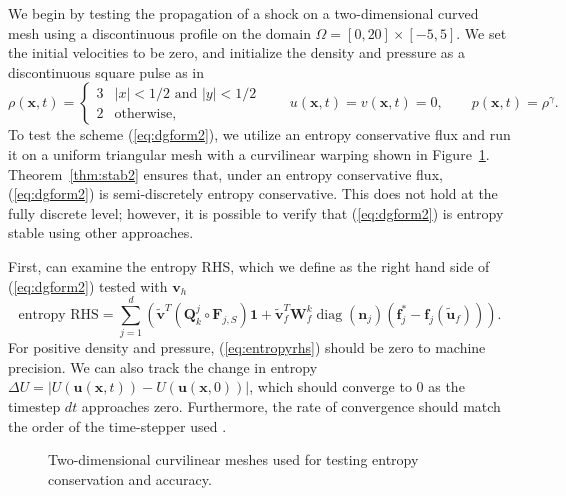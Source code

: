 \documentclass[preprint,10pt]{article}
\theoremstyle{definition}
\theoremstyle{lemma}
\theoremstyle{theorem}
\theoremstyle{assumption}
\DeclareMathOperator{\diag}{diag}
\renewcommand{\tilde}{\widetilde}
\newcommand{\LRp}[1]{\left( #1 \right)}
\newcommand{\LRb}[1]{\left| #1 \right|}
\begin{document}
{We begin by testing the propagation of a shock on a two-dimensional curved mesh using a discontinuous profile on the domain $\Omega = [0,20] \times [-5,5]$.   We set the initial velocities to be zero, and initialize the density and pressure as a discontinuous square pulse as in \cite{chan2017discretely}
\begin{equation}
\rho(\bm{x},t) = \begin{cases}
3 & \LRb{x} < 1/2 \text{ and } \LRb{y} < 1/2\\
2 & \text{otherwise},
\end{cases} \qquad 
u(\bm{x},t) = v(\bm{x},t) = 0, \qquad
p(\bm{x},t) = \rho^\gamma.
\label{eq:discontin}
\end{equation}
To test the scheme (\ref{eq:dgform2}), we utilize an entropy conservative flux and run it on a uniform triangular mesh with a curvilinear warping shown in Figure~\ref{fig:warp2d}.   Theorem~\ref{thm:stab2} ensures that, under an entropy conservative flux, (\ref{eq:dgform2}) is semi-discretely entropy conservative.  This does not hold at the fully discrete level; however, it is possible to verify that (\ref{eq:dgform2}) is entropy stable using other approaches.  

First, can examine the entropy RHS, which we define as the right hand side of (\ref{eq:dgform2}) tested with $\bm{v}_h$
\begin{equation}
  \text{entropy RHS}= \sum_{j=1}^d\LRp{ \tilde{\bm{v}}^T\LRp{\bm{Q}^j_k \circ \bm{F}_{j,S}}\bm{1} + \tilde{\bm{v}}_f^T\bm{W}_f^k \diag\LRp{\bm{n}_j}\LRp{\bm{f}_j^* - \bm{f}_j(\tilde{\bm{u}}_f)}}.  
\label{eq:entropyrhs}
\end{equation}
For positive density and pressure, (\ref{eq:entropyrhs}) should be zero to machine precision.  We can also track the change in entropy $\Delta U = \LRb{U(\bm{u}(\bm{x},t))-U(\bm{u}(\bm{x},0))}$, which should converge to $0$ as the timestep $dt$ approaches zero.  Furthermore, the rate of convergence should match the order of the time-stepper used \cite{gassner2016well,chan2017discretely}.  

\begin{figure}
\centering
{}
\hspace{1em}
\caption{Two-dimensional curvilinear meshes used for testing entropy conservation and accuracy.}
\label{fig:warp2d}
\end{figure}

}
\end{document}
